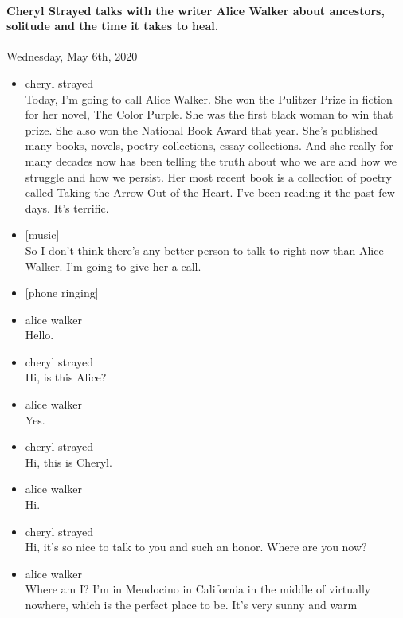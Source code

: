 \hypertarget{cheryl-strayed-talks-with-the-writer-alice-walker-about-ancestors-solitude-and-the-time-it-takes-to-heal}{%
\paragraph{Cheryl Strayed talks with the writer Alice Walker about
ancestors, solitude and the time it takes to
heal.}\label{cheryl-strayed-talks-with-the-writer-alice-walker-about-ancestors-solitude-and-the-time-it-takes-to-heal}}

Wednesday, May 6th, 2020

\begin{itemize}
\item
  cheryl strayed\\
  Today, I'm going to call Alice Walker. She won the Pulitzer Prize in
  fiction for her novel, The Color Purple. She was the first black woman
  to win that prize. She also won the National Book Award that year.
  She's published many books, novels, poetry collections, essay
  collections. And she really for many decades now has been telling the
  truth about who we are and how we struggle and how we persist. Her
  most recent book is a collection of poetry called Taking the Arrow Out
  of the Heart. I've been reading it the past few days. It's terrific.
\item
  {[}music{]}\\
  So I don't think there's any better person to talk to right now than
  Alice Walker. I'm going to give her a call.
\item
  {[}phone ringing{]}
\item
  alice walker\\
  Hello.
\item
  cheryl strayed\\
  Hi, is this Alice?
\item
  alice walker\\
  Yes.
\item
  cheryl strayed\\
  Hi, this is Cheryl.
\item
  alice walker\\
  Hi.
\item
  cheryl strayed\\
  Hi, it's so nice to talk to you and such an honor. Where are you now?
\item
  alice walker\\
  Where am I? I'm in Mendocino in California in the middle of virtually
  nowhere, which is the perfect place to be. It's very sunny and warm

\end{itemize}
